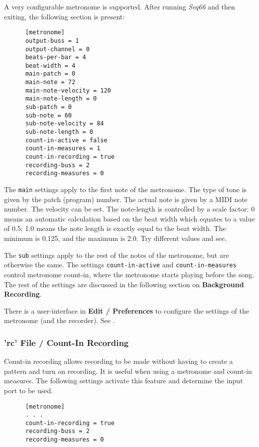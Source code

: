   A very configurable metronome is supported.
   After running \textsl{Seq66} and then
   exiting, the following section is present:

   \begin{verbatim}
      [metronome]
      output-buss = 1
      output-channel = 0
      beats-per-bar = 4
      beat-width = 4
      main-patch = 0
      main-note = 72
      main-note-velocity = 120
      main-note-length = 0
      sub-patch = 0
      sub-note = 60
      sub-note-velocity = 84
      sub-note-length = 0
      count-in-active = false
      count-in-measures = 1
      count-in-recording = true
      recording-buss = 2
      recording-measures = 0
   \end{verbatim}

   The \texttt{main} settings apply to the first note of the metronome.
   The type of tone is given by the patch (program) number.
   The actual note is given by a MIDI note number.
   The velocity can be set.
   The note-length is controlled by a scale factor:  0 means an automatic
   calculation based on the beat width which equates to a value of 0.5;
   1.0 means the note length is exactly equal to the beat width.
   The minimum is 0.125, and the maximum is 2.0.
   Try different values and see.

   The \texttt{sub} settings apply to the rest of the notes of the metronome,
   but are otherwise the same.
   The settings \texttt{count-in-active} and \texttt{count-in-measures}
   control metronome count-in, where the metronome starts playing before the
   song.
   The rest of the settings are discussed in the following section on
   \textbf{Background Recording}.

   There is a user-interface in
   \textbf{Edit / Preferences} to configure the settings of the metronome (and
   the recorder).
   See .

\subsubsection{'rc' File / Count-In Recording}
\label{subsubsec:configuration_rc_background_recording}

   Count-in recording allows recording to be made without having to create a
   pattern and turn on recording.
   It is useful when using a metronome and count-in measures.
   The following settings activate this feature
   and determine the input port to be used.

   \begin{verbatim}
      [metronome]
      . . .
      count-in-recording = true
      recording-buss = 2
      recording-measures = 0
   \end{verbatim}

